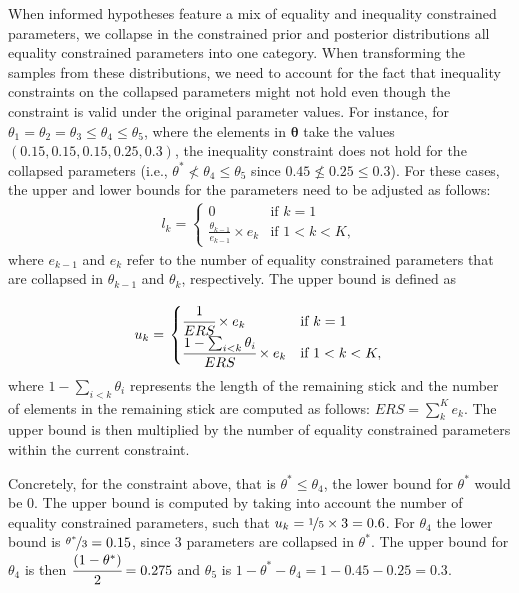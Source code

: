 \documentclass[
  english,
  man,floatsintext]{apa6}
\begin{document}
\begin{appendix}
When informed hypotheses feature a mix of equality and inequality
constrained parameters, we collapse in the constrained prior and
posterior distributions all equality constrained parameters into one
category. When transforming the samples from these distributions, we
need to account for the fact that inequality constraints on the
collapsed parameters might not hold even though the constraint is valid
under the original parameter values. For instance, for
\(\theta_1 = \theta_2 = \theta_3 \leq \theta_4 \leq \theta_5\), where
the elements in \(\boldsymbol{\theta}\) take the values
\((0.15, 0.15, 0.15, 0.25, 0.3)\), the inequality constraint does not
hold for the collapsed parameters (i.e.,
\(\theta^* \nless \theta_4 \leq \theta_5\) since
\(0.45 \nleq 0.25 \leq 0.3\)). For these cases, the upper and lower
bounds for the parameters need to be adjusted as follows: \begin{align}
l_k = \left.
\begin{cases}
0 & \text{if } k = 1 \\
\frac{\theta_{k - 1}}{e_{k-1}} \times e_k & \text{if } 1 < k < K,
\end{cases}
\right.
\end{align} where \(e_{k-1}\) and \(e_k\) refer to the number of
equality constrained parameters that are collapsed in \(\theta_{k - 1}\)
and \(\theta_{k}\), respectively. The upper bound is defined as

\begin{align}
u_k = \left.
\begin{cases}
\cfrac{1}{ERS} \times e_k & \text{if } k = 1 \\
\cfrac{1 - \sum_{i < k} \theta_i}{ERS} \times e_k & \text{if } 1 < k < K,
\end{cases}
\right.
\end{align} where \(1 - \sum_{i < k} \theta_i\) represents the length of
the remaining stick and the number of elements in the remaining stick
are computed as follows: \(ERS = \sum_k^{K} e_k\). The upper bound is
then multiplied by the number of equality constrained parameters within
the current constraint.

Concretely, for the constraint above, that is
\(\theta^* \leq \theta_4\), the lower bound for \(\theta^*\) would be
\(0\). The upper bound is computed by taking into account the number of
equality constrained parameters, such that
\(u_k = \nicefrac{1}{5} \times 3 = 0.6\). For \(\theta_4\) the lower
bound is \(\nicefrac{\theta^*}{3} = 0.15\), since \(3\) parameters are
collapsed in \(\theta^*\). The upper bound for \(\theta_4\) is then
\(\cfrac{(1 - \theta^*)}{2} = 0.275\) and \(\theta_5\) is
\(1 - \theta^* - \theta_4 = 1 - 0.45 - 0.25 = 0.3\).


\end{appendix}
\end{document}
